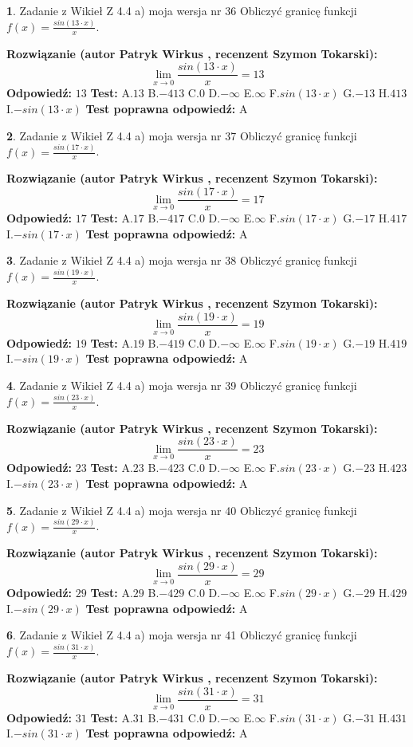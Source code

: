 \documentclass[12pt, a4paper]{article}
\theoremstyle{definition} %
\newtheorem{zad}{}
\newcommand{\zadStart}[1]{\begin{zad}#1\newline}
\newcommand{\zadStop}{\end{zad}}
\newcommand{\rozwStart}[2]{\noindent \textbf{Rozwiązanie (autor #1 , recenzent #2): }\newline}
\newcommand{\rozwStop}{\newline}
\newcommand{\odpStart}{\noindent \textbf{Odpowiedź:}\newline}
\newcommand{\odpStop}{\newline}
\newcommand{\testStart}{\noindent \textbf{Test:}\newline}
\newcommand{\testStop}{\newline}
\newcommand{\kluczStart}{\noindent \textbf{Test poprawna odpowiedź:}\newline}
\newcommand{\kluczStop}{\newline}
\begin{document}
\zadStart{Zadanie z Wikieł Z 4.4 a) moja wersja nr 36}
Obliczyć granicę funkcji $f(x)=\frac{sin(13\cdot x)}{x}$.
\zadStop
\rozwStart{Patryk Wirkus}{Szymon Tokarski}
$$\lim\limits_{x\to 0}\frac{sin(13\cdot x)}{x}=
13$$
\rozwStop
\odpStart
$13$
\odpStop
\testStart
A.$13$
B.$-413$
C.$0$
D.$-\infty$
E.$\infty$
F.$sin(13\cdot x)$
G.$-13$
H.$413$
I.$-sin(13\cdot x)$
\testStop
\kluczStart
A
\kluczStop



\zadStart{Zadanie z Wikieł Z 4.4 a) moja wersja nr 37}
Obliczyć granicę funkcji $f(x)=\frac{sin(17\cdot x)}{x}$.
\zadStop
\rozwStart{Patryk Wirkus}{Szymon Tokarski}
$$\lim\limits_{x\to 0}\frac{sin(17\cdot x)}{x}=
17$$
\rozwStop
\odpStart
$17$
\odpStop
\testStart
A.$17$
B.$-417$
C.$0$
D.$-\infty$
E.$\infty$
F.$sin(17\cdot x)$
G.$-17$
H.$417$
I.$-sin(17\cdot x)$
\testStop
\kluczStart
A
\kluczStop



\zadStart{Zadanie z Wikieł Z 4.4 a) moja wersja nr 38}
Obliczyć granicę funkcji $f(x)=\frac{sin(19\cdot x)}{x}$.
\zadStop
\rozwStart{Patryk Wirkus}{Szymon Tokarski}
$$\lim\limits_{x\to 0}\frac{sin(19\cdot x)}{x}=
19$$
\rozwStop
\odpStart
$19$
\odpStop
\testStart
A.$19$
B.$-419$
C.$0$
D.$-\infty$
E.$\infty$
F.$sin(19\cdot x)$
G.$-19$
H.$419$
I.$-sin(19\cdot x)$
\testStop
\kluczStart
A
\kluczStop



\zadStart{Zadanie z Wikieł Z 4.4 a) moja wersja nr 39}
Obliczyć granicę funkcji $f(x)=\frac{sin(23\cdot x)}{x}$.
\zadStop
\rozwStart{Patryk Wirkus}{Szymon Tokarski}
$$\lim\limits_{x\to 0}\frac{sin(23\cdot x)}{x}=
23$$
\rozwStop
\odpStart
$23$
\odpStop
\testStart
A.$23$
B.$-423$
C.$0$
D.$-\infty$
E.$\infty$
F.$sin(23\cdot x)$
G.$-23$
H.$423$
I.$-sin(23\cdot x)$
\testStop
\kluczStart
A
\kluczStop



\zadStart{Zadanie z Wikieł Z 4.4 a) moja wersja nr 40}
Obliczyć granicę funkcji $f(x)=\frac{sin(29\cdot x)}{x}$.
\zadStop
\rozwStart{Patryk Wirkus}{Szymon Tokarski}
$$\lim\limits_{x\to 0}\frac{sin(29\cdot x)}{x}=
29$$
\rozwStop
\odpStart
$29$
\odpStop
\testStart
A.$29$
B.$-429$
C.$0$
D.$-\infty$
E.$\infty$
F.$sin(29\cdot x)$
G.$-29$
H.$429$
I.$-sin(29\cdot x)$
\testStop
\kluczStart
A
\kluczStop



\zadStart{Zadanie z Wikieł Z 4.4 a) moja wersja nr 41}
Obliczyć granicę funkcji $f(x)=\frac{sin(31\cdot x)}{x}$.
\zadStop
\rozwStart{Patryk Wirkus}{Szymon Tokarski}
$$\lim\limits_{x\to 0}\frac{sin(31\cdot x)}{x}=
31$$
\rozwStop
\odpStart
$31$
\odpStop
\testStart
A.$31$
B.$-431$
C.$0$
D.$-\infty$
E.$\infty$
F.$sin(31\cdot x)$
G.$-31$
H.$431$
I.$-sin(31\cdot x)$
\testStop
\kluczStart
A
\kluczStop
\end{document}
